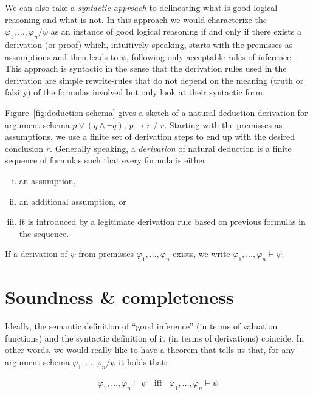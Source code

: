 \documentclass[nobib,nofonts]{tufte-handout}
\begin{document}
We can also take a \emph{syntactic approach} to delineating what is good logical reasoning and what is not.
In this approach we would characterize the $\varphi_{1}, \dots, \varphi_{n} / \psi$ as an instance of good logical reasoning if and only if there exists a derivation (or proof) which, intuitively speaking, starts with the premisses as assumptions and then leads to $\psi$, following only acceptable rules of inference.
This approach is syntactic in the sense that the derivation rules used in the derivation are simple rewrite-rules that do not depend on the meaning (truth or falsity) of the formulas involved but only look at their syntactic form.

Figure~\ref{fig:deduction-schema} gives a sketch of a natural deduction derivation for argument schema $p \vee (q \wedge \neg q)$, $p \rightarrow r$ / $r$.
Starting with the premisses as assumptions, we use a finite set of derivation steps to end up with the desired conclusion $r$.
Generally speaking, a \emph{derivation} of natural deduction is a finite sequence of formulas such that every formula is either
\begin{enumerate}[(i)]
  \item an assumption,
  \item an additional assumption, or
  \item it is introduced by a legitimate derivation rule based on previous formulas in the sequence.
\end{enumerate}
If a derivation of $\psi$ from premisses $\varphi_{1}, \dots, \varphi_{n}$ exists, we write $\varphi_{1}, \dots, \varphi_{n} \vdash \psi$.

\section{Soundness \& completeness}

Ideally, the semantic definition of ``good inference'' (in terms of valuation functions) and the syntactic definition of it (in terms of derivations) coincide.
In other words, we would really like to have a theorem that tells us that, for any argument schema $\varphi_{1}, \dots, \varphi_{n} / \psi$ it holds that:

\begin{align*}
  \varphi_{1}, \dots, \varphi_{n} \vdash \psi \ \ \ \
  \text{iff} \ \ \ \
  \varphi_{1}, \dots, \varphi_{n} \models \psi
\end{align*}
\end{document}
